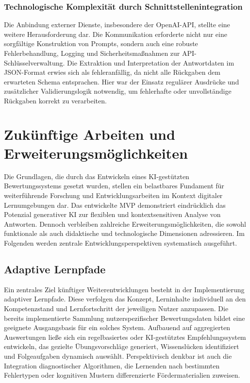 \documentclass[a4paper,12pt]{article}
\begin{document}
\subsubsection{Technologische Komplexität durch Schnittstellenintegration}

Die Anbindung externer Dienste, insbesondere der OpenAI-API, stellte eine weitere Herausforderung dar. Die Kommunikation erforderte nicht nur eine sorgfältige Konstruktion von Prompts, sondern auch eine robuste Fehlerbehandlung, Logging und Sicherheitsmaßnahmen zur API-Schlüsselverwaltung. Die Extraktion und Interpretation der Antwortdaten im JSON-Format erwies sich als fehleranfällig, da nicht alle Rückgaben dem erwarteten Schema entsprachen. Hier war der Einsatz regulärer Ausdrücke und zusätzlicher Validierungslogik notwendig, um fehlerhafte oder unvollständige Rückgaben korrekt zu verarbeiten.

\newpage

\section{Zukünftige Arbeiten und Erweiterungsmöglichkeiten}
Die Grundlagen, die durch das Entwickeln eines KI-gestützten Bewertungssystems gesetzt wurden, stellen ein belastbares Fundament für weiterführende Forschung und Entwicklungsarbeiten im Kontext digitaler Lernumgebungen dar. Das entwickelte MVP demonstriert eindrücklich das Potenzial generativer KI zur flexiblen und kontextsensitiven Analyse von Antworten. Dennoch verbleiben zahlreiche Erweiterungsmöglichkeiten, die sowohl funktionale als auch didaktische und technologische Dimensionen adressieren. Im Folgenden werden zentrale Entwicklungsperspektiven systematisch ausgeführt.

\subsection{Adaptive Lernpfade}
Ein zentrales Ziel künftiger Weiterentwicklungen besteht in der Implementierung adaptiver Lernpfade. Diese verfolgen das Konzept, Lerninhalte individuell an den Kompetenzstand und Lernfortschritt der jeweiligen Nutzer anzupassen. Die bereits implementierte Sammlung nutzerspezifischer Bewertungsdaten bildet eine geeignete Ausgangsbasis für ein solches System. Aufbauend auf aggregierten Auswertungen ließe sich ein regelbasiertes oder KI-gestütztes Empfehlungssystem entwickeln, das gezielte Übungsvorschläge generiert, Wissenslücken identifiziert und Folgeaufgaben dynamisch auswählt. Perspektivisch denkbar ist auch die Integration diagnostischer Algorithmen, die Lernenden nach bestimmten Fehlertypen oder kognitiven Mustern differenzierte Fördermaterialien zuweisen.
\end{document}
